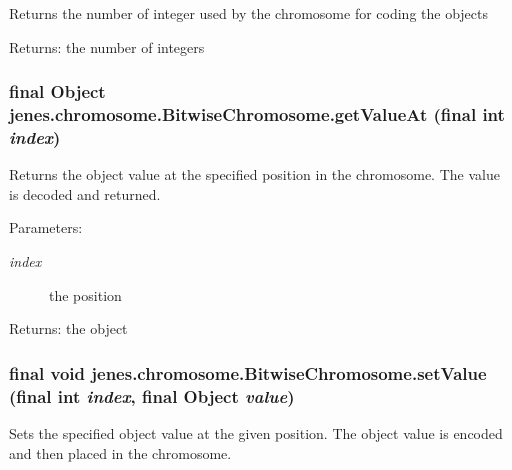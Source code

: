 Returns the number of integer used by the chromosome for coding the objects

\begin{Desc}
\item[Returns:]the number of integers \end{Desc}
\hypertarget{classjenes_1_1chromosome_1_1_bitwise_chromosome_3061d34e1f0c0faa915d4da7ea2f615c}{
\subsubsection[getValueAt]{\setlength{\rightskip}{0pt plus 5cm}final Object jenes.chromosome.BitwiseChromosome.getValueAt (final int {\em index})}}
\label{classjenes_1_1chromosome_1_1_bitwise_chromosome_3061d34e1f0c0faa915d4da7ea2f615c}


Returns the object value at the specified position in the chromosome. The value is decoded and returned.

\begin{Desc}
\item[Parameters:]
\begin{description}
\item[{\em index}]the position \end{description}
\end{Desc}
\begin{Desc}
\item[Returns:]the object \end{Desc}
\hypertarget{classjenes_1_1chromosome_1_1_bitwise_chromosome_aa42be8f0c26735e8a8d603d9b743b6a}{
\subsubsection[setValue]{\setlength{\rightskip}{0pt plus 5cm}final void jenes.chromosome.BitwiseChromosome.setValue (final int {\em index}, \/  final Object {\em value})}}
\label{classjenes_1_1chromosome_1_1_bitwise_chromosome_aa42be8f0c26735e8a8d603d9b743b6a}


Sets the specified object value at the given position. The object value is encoded and then placed in the chromosome.

